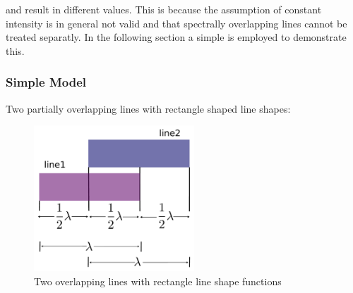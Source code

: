  and  result in different values. This is because the assumption of constant intensity 
is in general not valid and that spectrally overlapping lines cannot be treated separatly. 
In the following section a simple is employed to demonstrate this.

\subsubsection{Simple Model}

Two partially overlapping lines with rectangle shaped line shapes:
\begin{figure}[ht]
	\includegraphics[width=6cm]{figures/overlappinglines2.pdf}
	\caption{Two overlapping lines with rectangle line shape functions}
	\label{fig:overlappinglines}
\end{figure}

